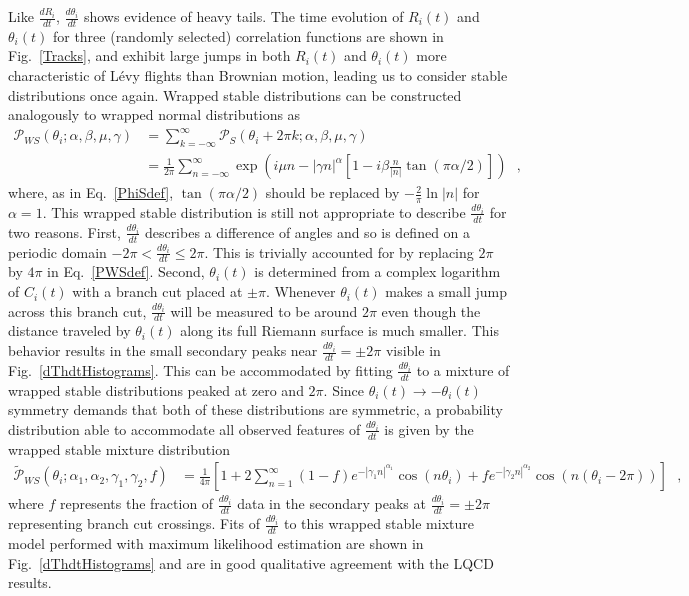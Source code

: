 Like $\frac{dR_i}{dt}$, $\frac{d\theta_i}{dt}$ shows evidence of heavy tails. 
The time evolution of $R_i(t)$ and $\theta_i(t)$ for three (randomly selected)
correlation functions are shown in Fig.~\ref{Tracks}, 
and exhibit large jumps in both $R_i(t)$ and $\theta_i(t)$ more characteristic of L{\'e}vy flights than Brownian motion,
leading us to consider stable distributions once again.
Wrapped stable distributions can be constructed analogously to wrapped normal distributions as
%
\begin{equation}
  \begin{split}
    \mathcal{P}_{WS}(\theta_i; \alpha, \beta, \mu, \gamma) &= 
    \sum_{k=-\infty}^\infty \mathcal{P}_S(\theta_i + 2\pi k; \alpha, \beta, \mu, \gamma) \\
    &= \frac{1}{2\pi}\sum_{n=-\infty}^\infty \exp\left( i\mu n - |\gamma n|^\alpha\left[ 1 - i\beta\frac{n}{|n|}\tan(\pi \alpha/2) \right] \right)
    \ \ \   ,
  \end{split}
  \label{PWSdef}
\end{equation}
%
where, as in Eq.~\eqref{PhiSdef}, 
$\tan(\pi \alpha/2)$ should be replaced by $-\frac{2}{\pi}\ln|n|$ for $\alpha = 1$. 
This wrapped stable distribution is still not appropriate to describe $\frac{d\theta_i}{dt}$ for two reasons. 
First, $\frac{d\theta_i}{dt}$ describes a difference of angles and so is defined on a periodic domain 
$-2\pi < \frac{d\theta_i}{dt} \leq 2\pi$. 
This is trivially accounted for by replacing $2\pi$ by $4\pi$ in Eq.~\eqref{PWSdef}. 
Second, $\theta_i(t)$ is determined from a complex logarithm of $C_i(t)$ with a branch cut placed at $\pm \pi$. 
Whenever $\theta_i(t)$ makes a small jump across this branch cut, $\frac{d\theta_i}{dt}$ will be measured to be around $2\pi$ 
even though the distance traveled by $\theta_i(t)$ along its full Riemann surface is much smaller. 
This behavior results in the small secondary peaks near $\frac{d\theta_i}{dt} = \pm 2\pi$ visible in Fig.~\ref{dThdtHistograms}. 
This can be accommodated by fitting $\frac{d\theta_i}{dt}$ to a mixture of wrapped stable distributions 
peaked at zero and $2\pi$. Since $\theta_i(t)\rightarrow-\theta_i(t)$ symmetry demands that both of these 
distributions are symmetric, a probability distribution able to accommodate all observed features of 
$\frac{d\theta_i}{dt}$ is given by the wrapped stable mixture distribution
%
\begin{equation}
  \begin{split}
    \tilde{\mathcal{P}}_{WS}(\theta_i; \alpha_1, \alpha_2, \gamma_1, \gamma_2, f) &= 
    \frac{1}{4\pi}\left[ 1 + 2\sum_{n=1}^\infty (1-f)e^{-|\gamma_1 n|^{\alpha_1}}\cos(n\theta_i) 
    + f e^{-|\gamma_2 n|^{\alpha_2}}\cos(n(\theta_i - 2\pi)) \right]
    \ \ \  ,
  \end{split}
  \label{PWSMixdef}
\end{equation}
%
where $f$ represents the fraction of $\frac{d\theta_i}{dt}$ data in the secondary peaks at $\frac{d\theta_i}{dt} = \pm 2\pi$ 
representing branch cut crossings. Fits of $\frac{d\theta_i}{dt}$ to this wrapped stable mixture model performed with 
maximum likelihood estimation are shown in Fig.~\ref{dThdtHistograms} and are in good qualitative agreement with the LQCD results.

